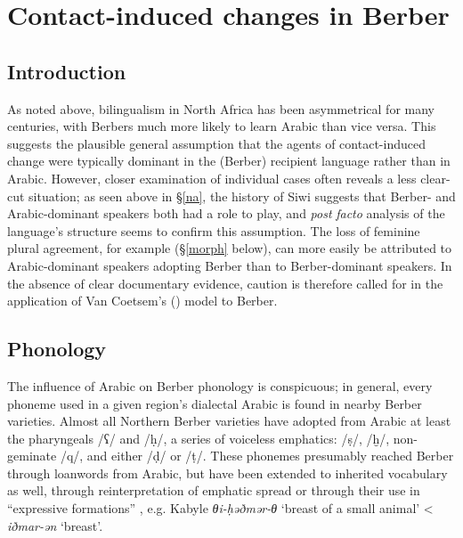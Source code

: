 \documentclass[output=paper]{langsci/langscibook}
\begin{document}
 \section{Contact-induced changes in Berber}


 \subsection{Introduction}


As noted above, bilingualism in North Africa has been asymmetrical for many centuries, with Berbers much more likely to learn Arabic than vice versa. This suggests the plausible general assumption that the agents of contact-induced change were typically dominant in the (Berber) recipient language rather than in Arabic.  However, closer examination of individual cases often reveals a less clear-cut situation; as seen above in §\ref{na}, the history of Siwi suggests that Berber- and Arabic-dominant speakers both had a role to play, and \textit{post} \textit{facto} analysis of the language's structure seems to confirm this assumption.  The loss of feminine plural agreement, for example (§\ref{morph} below), can more easily be attributed to Arabic-dominant speakers adopting Berber than to Berber-dominant speakers.  In the absence of clear documentary evidence, caution is therefore called for in the application of Van Coetsem's (\citeyear{VanCoetsem1988,VanCoetsem2000}) model to Berber.


 
 \subsection{Phonology}


The influence of Arabic on Berber phonology is conspicuous; in general, every phoneme used in a given region's dialectal Arabic is found in nearby Berber varieties. Almost all Northern Berber varieties have adopted from Arabic at least the pharyngeals /ʕ/ and /ḥ/, a series of voiceless emphatics: /ṣ/, /ḫ/, non-geminate /q/, and either /ḍ/ or /ṭ/. These phonemes presumably reached Berber through loanwords from Arabic, but have been extended to inherited vocabulary as well, through reinterpretation of emphatic spread or through their use in “expressive formations” \citep[199]{Kossmann2013book}, e.g. Kabyle \textit{θi-ḥəðmər-θ} `breast of a small animal' < \textit{iðmar-ən} `breast'.
\end{document}
